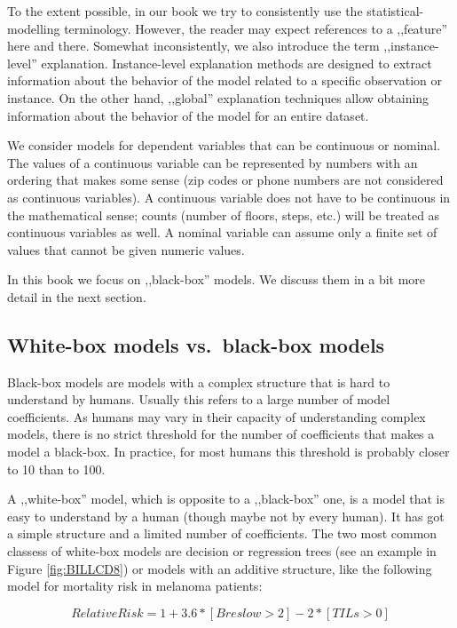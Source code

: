 \documentclass[]{krantz}
\theoremstyle{definition}
\theoremstyle{definition}
\theoremstyle{definition}
\theoremstyle{remark}
\begin{document}
To the extent possible, in our book we try to consistently use the
statistical-modelling terminology. However, the reader may expect
references to a ,,feature'' here and there. Somewhat inconsistently, we
also introduce the term ,,instance-level'' explanation. Instance-level
explanation methods are designed to extract information about the
behavior of the model related to a specific observation or instance. On
the other hand, ,,global'' explanation techniques allow obtaining
information about the behavior of the model for an entire dataset.

We consider models for dependent variables that can be continuous or
nominal. The values of a continuous variable can be represented by
numbers with an ordering that makes some sense (zip codes or phone
numbers are not considered as continuous variables). A continuous
variable does not have to be continuous in the mathematical sense;
counts (number of floors, steps, etc.) will be treated as continuous
variables as well. A nominal variable can assume only a finite set of
values that cannot be given numeric values.

In this book we focus on ,,black-box'' models. We discuss them in a bit
more detail in the next section.

\hypertarget{white-box-models-vs.black-box-models}{%
\subsection{White-box models vs.~black-box
models}\label{white-box-models-vs.black-box-models}}

Black-box models are models with a complex structure that is hard to
understand by humans. Usually this refers to a large number of model
coefficients. As humans may vary in their capacity of understanding
complex models, there is no strict threshold for the number of
coefficients that makes a model a black-box. In practice, for most
humans this threshold is probably closer to 10 than to 100.

A ,,white-box'' model, which is opposite to a ,,black-box'' one, is a
model that is easy to understand by a human (though maybe not by every
human). It has got a simple structure and a limited number of
coefficients. The two most common classess of white-box models are
decision or regression trees (see an example in Figure
\ref{fig:BILLCD8}) or models with an additive structure, like the
following model for mortality risk in melanoma patients:

\[
RelativeRisk = 1 + 3.6 * [Breslow > 2] - 2 * [TILs > 0] 
\]
\end{document}
